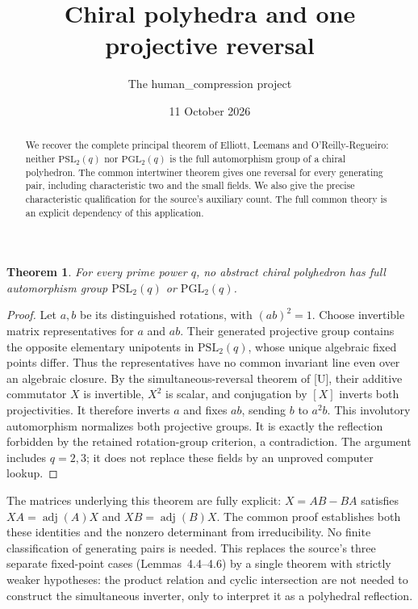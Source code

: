 \documentclass[11pt,a4paper]{article}
\title{Chiral polyhedra and one projective reversal}
\author{The human\_compression project}\date{11 October 2026}
\newtheorem{theorem}{Theorem}\newtheorem{proposition}[theorem]{Proposition}
\begin{document}
\maketitle
\begin{abstract}
We recover the complete principal theorem of Elliott, Leemans and
O'Reilly-Regueiro: neither $\mathrm{PSL}_2(q)$ nor $\mathrm{PGL}_2(q)$
is the full automorphism group of a chiral polyhedron. The common
intertwiner theorem gives one reversal for every generating pair,
including characteristic two and the small fields. We also give the
precise characteristic qualification for the source's auxiliary count.
The full common theory is an explicit dependency of this application.
\end{abstract}

\begin{theorem}
For every prime power $q$, no abstract chiral polyhedron has full
automorphism group $\mathrm{PSL}_2(q)$ or $\mathrm{PGL}_2(q)$.
\end{theorem}
\begin{proof}
Let $a,b$ be its distinguished rotations, with $(ab)^2=1$.
Choose invertible matrix representatives for $a$ and $ab$.
Their generated projective group contains the opposite elementary
unipotents in $\mathrm{PSL}_2(q)$, whose unique algebraic fixed points
differ. Thus the representatives have no common invariant line even
over an algebraic closure. By the simultaneous-reversal theorem of
[U], their additive commutator $X$ is invertible, $X^2$ is scalar,
and conjugation by $[X]$ inverts both projectivities. It therefore
inverts $a$ and fixes $ab$, sending $b$ to $a^2b$.
This involutory automorphism normalizes both projective groups.
It is exactly the reflection forbidden by the retained rotation-group
criterion, a contradiction. The argument includes $q=2,3$; it does
not replace these fields by an unproved computer lookup.
\end{proof}

The matrices underlying this theorem are fully explicit:
$X=AB-BA$ satisfies $XA=\operatorname{adj}(A)X$ and
$XB=\operatorname{adj}(B)X$. The common proof establishes both these
identities and the nonzero determinant from irreducibility.
No finite classification of generating pairs is needed. This replaces
the source's three separate fixed-point cases (Lemmas~4.4--4.6) by a
single theorem with strictly weaker hypotheses: the product relation
and cyclic intersection are not needed to construct the simultaneous
inverter, only to interpret it as a polyhedral reflection.
\end{document}
